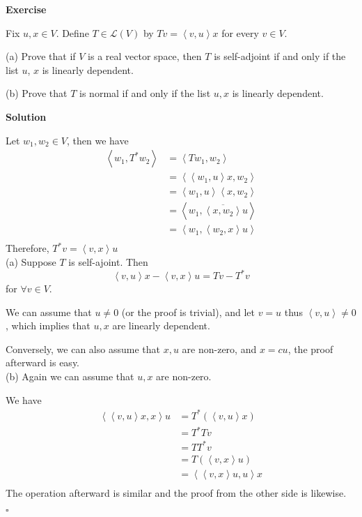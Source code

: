 \documentclass{article}
\newenvironment{exercise}{%
{\textbf{Exercise\\}
    }
}{
}
\newenvironment{solution}{%
{
    \textbf{Solution\\}
    }
}{
  \hfill $\square$ 
  \par\bigskip 
}
\newcommand{\parameter}[1]{\left(#1\right)}
\begin{document}
\begin{CJK}{UTF8}{gkai}
\begin{exercise}
    Fix $u,x \in  V$. Define $T \in \mathcal{L}(V)$ by $Tv = \left<v,u\right>x$ for every $v \in  V$.
    
    (a) Prove that if $V$ is a real vector space, then $T$ is self-adjoint if and only if the list $u$, $x$ is linearly dependent.

    (b) Prove that $T$ is normal if and only if the list $u,x$ is linearly dependent.
\end{exercise}

\begin{solution}
    Let $w_1, w_2 \in V$, then we have
    \[
    \begin{aligned}
        \left<w_1,T^\ast w_2\right> &= \left<Tw_1, w_2\right>\\
        &= \left<\left<w_1,u\right> x, w_2\right>\\
        &= \left<w_1,u\right>\left< x, w_2\right>\\
        &= \left<w_1,\overline{\left< x, w_2\right>}u\right>\\
        &= \left<w_1,\left<w_2,x\right>u\right>\\
    \end{aligned}    
    \]
    Therefore, $T^\ast v = \left<v,x\right>u$\\

    (a) Suppose $T$ is self-ajoint. Then 
    \[\left<v,u\right>x - \left<v,x\right>u = Tv - T^\ast v\]
    for $\forall v \in V$.

    We can assume that $u \neq 0$ (or the proof is trivial), and let $v = u$ thus $\left<v,u\right> \neq 0$, which implies that $u,x$ are linearly dependent.

    Conversely, we can also assume that $x,u$ are non-zero, and $x = cu$, the proof afterward is easy.\\

    (b) Again we can assume that $u,x$ are non-zero.

    We have
    \[\begin{aligned}
        \left<\left<v,u\right> x,x\right> u &= T^\ast \parameter{\left<v,u\right> x}\\
        &= T^\ast T v\\
        &= T T^\ast v\\
        &= T \parameter{\left<v,x\right> u}\\
        &= \left<\left<v,x\right> u,u\right> x\\
    \end{aligned}
        \]
        The operation afterward is similar and the proof from the other side is likewise.
\end{solution}


\end{CJK}
\end{document}
